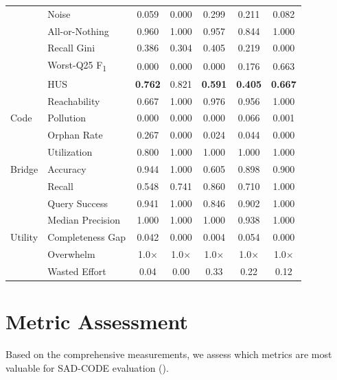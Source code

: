 \documentclass[11pt,a4paper]{report}
\newcommand{\sadcode}{SAD-CODE\xspace}
\newcommand{\fone}{F\textsubscript{1}\xspace}
\begin{document}
\begin{table}[h]
\begin{tabular}{llccccc}
 & Noise               & 0.059 & 0.000 & 0.299 & 0.211 & 0.082 \\
 & All-or-Nothing      & 0.960 & 1.000 & 0.957 & 0.844 & 1.000 \\
 & Recall Gini         & 0.386 & 0.304 & 0.405 & 0.219 & 0.000 \\
 & Worst-Q25 \fone     & 0.000 & 0.000 & 0.000 & 0.176 & 0.663 \\
 & HUS                 & \textbf{0.762} & 0.821 & \textbf{0.591} & \textbf{0.405} & \textbf{0.667} \\
\midrule
\multirow{3}{*}{Code}
 & Reachability        & 0.667 & 1.000 & 0.976 & 0.956 & 1.000 \\
 & Pollution           & 0.000 & 0.000 & 0.000 & 0.066 & 0.001 \\
 & Orphan Rate         & 0.267 & 0.000 & 0.024 & 0.044 & 0.000 \\
\midrule
\multirow{3}{*}{Bridge}
 & Utilization         & 0.800 & 1.000 & 1.000 & 1.000 & 1.000 \\
 & Accuracy            & 0.944 & 1.000 & 0.605 & 0.898 & 0.900 \\
 & Recall              & 0.548 & 0.741 & 0.860 & 0.710 & 1.000 \\
\midrule
\multirow{5}{*}{Utility}
 & Query Success       & 0.941 & 1.000 & 0.846 & 0.902 & 1.000 \\
 & Median Precision    & 1.000 & 1.000 & 1.000 & 0.938 & 1.000 \\
 & Completeness Gap    & 0.042 & 0.000 & 0.004 & 0.054 & 0.000 \\
 & Overwhelm           & 1.0$\times$ & 1.0$\times$ & 1.0$\times$ & 1.0$\times$ & 1.0$\times$ \\
 & Wasted Effort       & 0.04 & 0.00 & 0.33 & 0.22 & 0.12 \\
\bottomrule
\end{tabular}
\end{table}


\section{Metric Assessment}
\label{sec:eval:assessment}

Based on the comprehensive measurements, we assess which metrics are most
valuable for \sadcode evaluation ().
\end{document}
